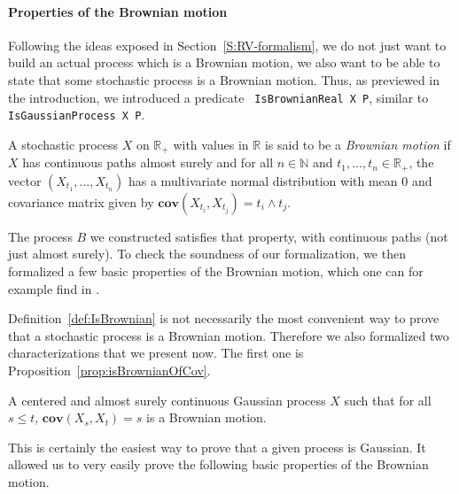\documentclass[lean]{Draft}
\makeatletter
\renewcommand{\lean}[1]{\lstinline| #1|}
\newcommand\leanlink{\begingroup\catcode`\#=12\relax\@leanlink}
\newcommand\@leanlink[2]{\endgroup
\href{#1}
{\texttt{\detokenize{#2}}}}
\newcommand{\mllink}[3]{%
\leanlink{https://github.com/leanprover-community/mathlib4/blob/6135ffb78e8bcd3fcc8ec02f3f82ea0b0737358b/Mathlib/#1.lean\##2}
{#3}}
\makeatother
\begin{document}
\paragraph{Properties of the Brownian motion}

Following the ideas exposed in Section~\ref{S:RV-formalism}, we do not just want to build an actual process which is a Brownian motion, we also want to be able to state that some stochastic process is a Brownian motion. Thus, as previewed in the introduction, we introduced a predicate \lean{IsBrownianReal X P}, similar to \lean{IsGaussianProcess X P}.

\begin{definition}[\mllink{Probability/BrownianMotion/Basic}{L300-L304}{ProbabilityTheory.IsBrownianReal}]\label{def:IsBrownian}
A stochastic process $X$ on $\mathbb{R}_+$ with values in $\mathbb{R}$ is said to be a \emph{Brownian motion} if $X$ has continuous paths almost surely and for all $n \in \mathbb{N}$ and $t_1, \ldots, t_n \in \mathbb{R}_+$, the vector $(X_{t_1}, \ldots, X_{t_n})$ has a multivariate normal distribution with mean $0$ and covariance matrix given by $\mathbf{cov}(X_{t_i}, X_{t_j}) = t_i \wedge t_j$.
\end{definition}

The process $B$ we constructed satisfies that property, with continuous paths (not just almost surely).
To check the soundness of our formalization, we then formalized a few basic properties of the Brownian motion, which one can for example find in \cite{LeGall2016}.

Definition~\ref{def:IsBrownian} is not necessarily the most convenient way to prove that a stochastic process is a Brownian motion. Therefore we also formalized two characterizations that we present now. The first one is Proposition~\ref{prop:isBrownianOfCov}.

\begin{proposition}[\mllink{Probability/BrownianMotion/Basic}{L130-L133}{IsGaussianProcess.isPreBrownianReal_of_covariance}]\label{prop:isBrownianOfCov}
A centered and almost surely continuous Gaussian process $X$ such that for all $s \le t$, $\mathbf{cov}(X_s, X_t) = s$ is a Brownian motion.
\end{proposition}

This is certainly the easiest way to prove that a given process is Gaussian. It allowed us to very easily prove the following basic properties of the Brownian motion.
\end{document}
